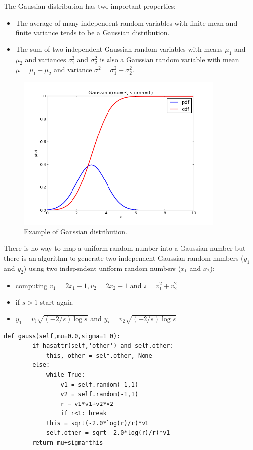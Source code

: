 \documentclass[justified,sixbynine]{tufte-book}
\def\ft{\small\tt}
\theoremstyle{plain}%
\theoremstyle{definition}
\theoremstyle{remark}
\begin{document}
\begin{fullwidth}
The Gaussian distribution has two important properties:
\begin{itemize}
\item The average of many independent random variables with finite mean and finite variance tends to be a Gaussian distribution.
\item The sum of two independent Gaussian random variables with means $\mu_1$ and $\mu_2$ and variances $\sigma_1^2$ and $\sigma_2^2$ is also a Gaussian random variable with mean $\mu = \mu_1+\mu_2$ and variance $\sigma^2 = \sigma_1^2+\sigma_2^2$.
\end{itemize}

\begin{figure}[ht]
\centering\includegraphics[width=4in]{images/gaussian.png}
\caption{Example of Gaussian distribution.}
\end{figure}

There is no way to map a uniform random number into a Gaussian number but there is an algorithm to generate two independent Gaussian random numbers ($y_1$ and $y_2$) using two independent uniform random numbers ($x_1$ and $x_2$):

\begin{itemize}
\item  computing $v_1=2x_1-1,v_2=2x_2-1$ and $s=v_1^2+v_2^2$
\item  if $s>1$ start again
\item  $y_1=v_1\sqrt{(-2/s)\log s}$ and $y_2=v_2\sqrt{(-2/s)\log s}$
\end{itemize}

\begin{lstlisting}[caption={in file: {\ft nlib.py}}]
    def gauss(self,mu=0.0,sigma=1.0):
        if hasattr(self,'other') and self.other:
            this, other = self.other, None
        else:
            while True:
                v1 = self.random(-1,1)
                v2 = self.random(-1,1)
                r = v1*v1+v2*v2
                if r<1: break
            this = sqrt(-2.0*log(r)/r)*v1
            self.other = sqrt(-2.0*log(r)/r)*v1
        return mu+sigma*this
\end{lstlisting}


\end{fullwidth}
\end{document}
